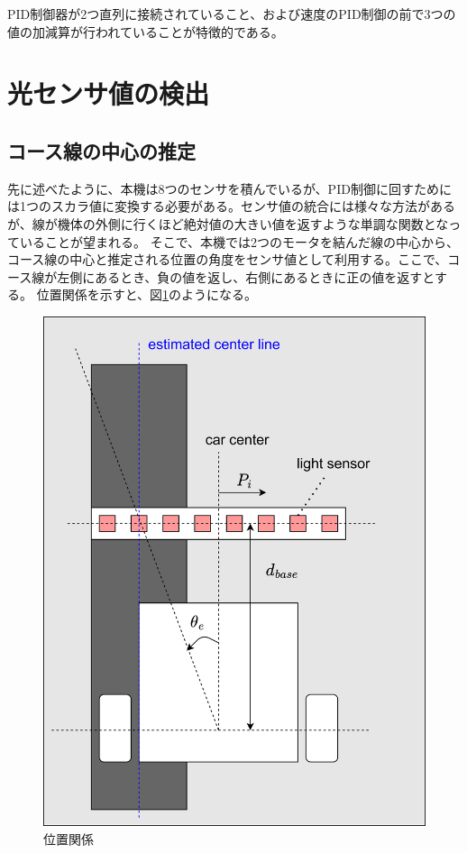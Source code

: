 \documentclass{ltjsreport}
\begin{document}
PID制御器が2つ直列に接続されていること、および速度のPID制御の前で3つの値の加減算が行われていることが特徴的である。


\section{光センサ値の検出}
\subsection{コース線の中心の推定}
先に述べたように、本機は8つのセンサを積んでいるが、PID制御に回すためには1つのスカラ値に変換する必要がある。センサ値の統合には様々な方法があるが、線が機体の外側に行くほど絶対値の大きい値を返すような単調な関数となっていることが望まれる。
そこで、本機では2つのモータを結んだ線の中心から、コース線の中心と推定される位置の角度をセンサ値として利用する。ここで、コース線が左側にあるとき、負の値を返し、右側にあるときに正の値を返すとする。
位置関係を示すと、図\ref{fig:linepos}のようになる。
\begin{figure}[bt]
  \centering
  \includegraphics[keepaspectratio, scale=0.05]
       {img/sensor_theta.drawio.png}
  \caption{位置関係}
  \label{fig:linepos}
 \end{figure}
\end{document}
